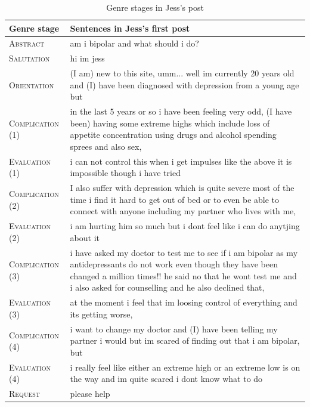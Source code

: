 \documentclass{article}
\begin{document}
\begin{table}[htb]\centering\small
\begin{tabularx}{\textwidth}{lX}

\toprule
Genre stage  & Sentences in Jess's first post   \\ \midrule
\textsc{Abstract }    & am i bipolar and what should i do? \\ 
\textsc{Salutation}   & hi im jess   \\ 
\textsc{Orientation}  & (I am) new to this site,  umm... well im currently 20 years old and (I) have been diagnosed with depression from a young age but \\ 
\textsc{Complication (1)} & in the last 5 years or so i have been feeling very odd, (I have been) having some extreme highs which include loss of appetite concentration using drugs and alcohol spending sprees and also sex, \\ 
\textsc{Evaluation (1)}   & i can not control this when i get impulses like the above it is impossible though i have tried \\ 
\textsc{Complication (2)} & I also suffer with depression which is quite severe most of the time i find it hard to get out of bed or to even be able to connect with anyone including my partner who lives with me,   \\ 
\textsc{Evaluation (2)}   &  i am hurting him so much but i dont feel like i can do anytjing about it   \\ 
\textsc{Complication (3)} & i have asked my doctor to test me to see if i am bipolar as my antidepressants do not work even though they have been changed a million times!! he said no that he wont test me and i also asked for counselling and he also declined that, \\ 
\textsc{Evaluation (3)} & at the moment i feel that im loosing control of everything and its getting worse, \\ 
\textsc{Complication (4)} &  i want to change my doctor and (I) have been telling my partner i would but im scared of finding out that i am bipolar, but  \\ 
\textsc{Evaluation (4)}   & i really feel like either an extreme high or an extreme low is on the way and im quite scared i dont know what to do  \\ 
\textsc{Request}     & please help   \\ \bottomrule
\end{tabularx}
\caption{Genre stages in Jess's post}
\label{jess-genre}
\end{table}
\end{document}
